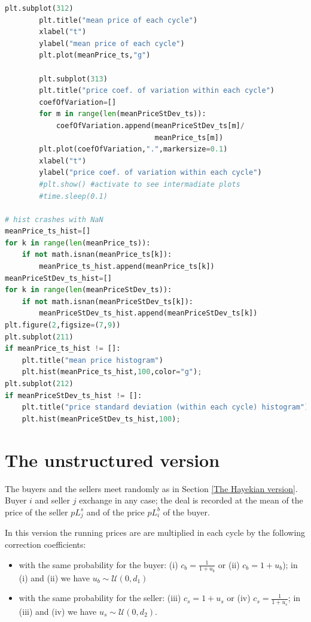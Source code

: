 \documentclass[10pt]{report}
\begin{document}
\begin{lstlisting}[language=Python, caption=The model in the simplified Hayekian perspective, label={The model in the simplified Hayekian perspective},basicstyle=\ttfamily\footnotesize]
        plt.subplot(312)
        plt.title("mean price of each cycle")
        xlabel("t")
        ylabel("mean price of each cycle")
        plt.plot(meanPrice_ts,"g")
        
        plt.subplot(313)
        plt.title("price coef. of variation within each cycle")
        coefOfVariation=[]
        for m in range(len(meanPriceStDev_ts)):
            coefOfVariation.append(meanPriceStDev_ts[m]/
                                   meanPrice_ts[m])
        plt.plot(coefOfVariation,".",markersize=0.1)
        xlabel("t")
        ylabel("price coef. of variation within each cycle")
        #plt.show() #activate to see intermadiate plots
        #time.sleep(0.1)

# hist crashes with NaN
meanPrice_ts_hist=[]
for k in range(len(meanPrice_ts)): 
    if not math.isnan(meanPrice_ts[k]):
        meanPrice_ts_hist.append(meanPrice_ts[k])
meanPriceStDev_ts_hist=[]
for k in range(len(meanPriceStDev_ts)): 
    if not math.isnan(meanPriceStDev_ts[k]):
        meanPriceStDev_ts_hist.append(meanPriceStDev_ts[k])
plt.figure(2,figsize=(7,9))
plt.subplot(211)
if meanPrice_ts_hist != []:
    plt.title("mean price histogram")
    plt.hist(meanPrice_ts_hist,100,color="g");
plt.subplot(212)
if meanPriceStDev_ts_hist != []:
    plt.title("price standard deviation (within each cycle) histogram")
    plt.hist(meanPriceStDev_ts_hist,100);
\end{lstlisting}


\section{The unstructured version}\label{The unstructured version}

The buyers and the sellers meet randomly as in Section \ref{The Hayekian version}. Buyer $i$ and seller $j$ exchange in any case; the deal is recorded at the mean of the price of the seller $pL^s_j$ and of the price $pL^b_i$ of the buyer.

In this version the running prices are  are multiplied in each cycle by the following  correction coefficients:

\begin{itemize}

\item with the same probability for the buyer: (i) $c_b=\frac{1} {1 + u_b}$ or (ii) $c_b=1 + u_b$); in (i) and (ii) we have $u_b\sim\mathcal{U}(0,d_1)$

\item  with the same probability for the seller: (iii) $c_s=1 + u_s$ or (iv) $c_s=\frac{1} {1 + u_s}$; in (iii) and (iv) we have $u_s\sim\mathcal{U}(0,d_2)$.
\end{itemize}
\end{document}
